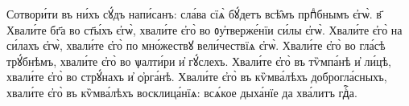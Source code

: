 
\hKv Сотвори́ти въ ни́хъ сꙋ́дъ напи́санъ: сла́ва сїѧ̀  бꙋ́детъ всѣ̑мъ прпⷣбнымъ є҆гѡ̀. 
в҃ Хвали́те бг҃а во  ст҃ы́хъ є҆гѡ̀, хвали́те є҆го̀ во ᲂу҆тверже́нїи си́лы  є҆гѡ̀. 
%
\hKv Хвали́те є҆го̀ на си́лахъ є҆гѡ̀, хвали́те  є҆го̀ по мно́жествꙋ вели́чествїѧ є҆гѡ̀. 
\hKv Хвали́те  є҆го̀ во гла́сѣ трꙋ́бнѣмъ, хвали́те є҆го̀ во ѱалти́ри  и҆ гꙋ́слехъ. 
\hKv Хвали́те є҆го̀ въ тѷмпа́нѣ и҆ ли́цѣ,  хвали́те є҆го̀ во стрꙋ́нахъ и҆ ѻ҆рга́нѣ. 
\hKv Хвали́те  є҆го̀ въ кѷмва́лѣхъ доброгла́сныхъ,  хвали́те є҆го̀ въ кѷмва́лѣхъ восклица́нїѧ: всѧ́кое  дыха́нїе да хва́литъ гдⷭ҇а. 

